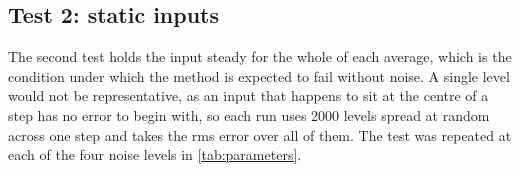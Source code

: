 \subsection{Test 2: static inputs}

The second test holds the input steady for the whole of each average, which
is the condition under which the method is expected to fail without noise. A
single level would not be representative, as an input that happens to sit at
the centre of a step has no error to begin with, so each run uses 2000 levels
spread at random across one step and takes the rms error over all of them.
The test was repeated at each of the four noise levels in
\cref{tab:parameters}.
